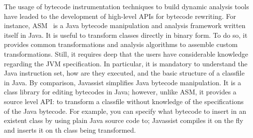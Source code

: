 The usage of bytecode instrumentation techniques to build dynamic analysis tools have leaded to the development of high-level APIs for bytecode rewriting.
For instance, ASM~\cite{Bruneton2002,Kuleshov2007} is a Java bytecode manipulation and analysis framework written itself in Java.
It is useful to transform classes directly in binary form.
To do so, it provides common transformations and analysis algorithms to assemble custom transformations.
Still, it requires deep that the users have considerable knowledge regarding the JVM specification.
In particular, it is mandatory to understand the Java instruction set, how are they executed, and the basic structure of a classfile in Java.
By comparison, Javassist \cite{Javassist1999} simplifies Java bytecode manipulation.
It is a class library for editing bytecodes in Java; however, unlike ASM, it provides a source level API: to transform a classfile without knowledge of the specifications of the Java bytecode.
For example, you can specify what bytecode to insert in an existent class by using plain Java source code to; Javassist compiles it on the fly and inserts it on th class being transformed.

